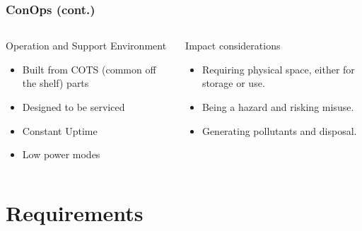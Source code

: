 \documentclass[aspectratio=169]{beamer}
\begin{document}
\begin{frame}
    \frametitle{ConOps (cont.)}

    \begin{columns}
        \begin{column}{0.48\textwidth}
            \begin{block}{Operation and Support Environment}
                \begin{itemize}
                 \item Built from COTS (common off the shelf) parts
                 \item Designed to be serviced
                 \item Constant Uptime
                 \item Low power modes
                \end{itemize}
            \end{block}
        \end{column}

        \begin{column}{0.48\textwidth}
            \begin{block}{Impact considerations}
                \begin{itemize}
                 \item Requiring physical space, either for storage or use.
                 \item Being a hazard and risking misuse.
                 \item Generating pollutants and disposal.
                \end{itemize}
            \end{block}
        \end{column}
    \end{columns}


\end{frame}


\section{Requirements}
\end{document}
